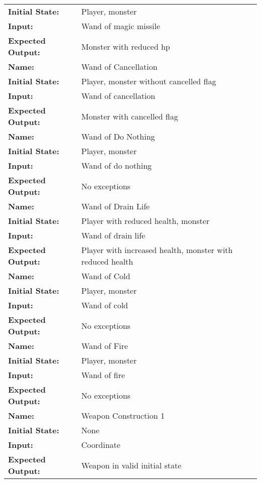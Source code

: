 \documentclass[12pt, titlepage]{article}
\begin{document}
\begin{center}
\begin{longtable}{ l | p{10cm} }
				\textbf{Initial State:} & Player, monster\\
				\textbf{Input:} & Wand of magic missile\\
				\textbf{Expected Output:} & Monster with reduced hp\\[0.6em]
				\hline
				\rule{0pt}{1.5em}\textbf{Name:} & Wand of Cancellation\\
				\textbf{Initial State:} & Player, monster without cancelled flag\\
				\textbf{Input:} & Wand of cancellation\\
				\textbf{Expected Output:} & Monster with cancelled flag\\[0.6em]
				\hline
				\rule{0pt}{1.5em}\textbf{Name:} & Wand of Do Nothing\\
				\textbf{Initial State:} & Player, monster\\
				\textbf{Input:} & Wand of do nothing\\
				\textbf{Expected Output:} & No exceptions\\[0.6em]
				\hline
				\rule{0pt}{1.5em}\textbf{Name:} & Wand of Drain Life\\
				\textbf{Initial State:} & Player with reduced health, monster\\
				\textbf{Input:} & Wand of drain life\\
				\textbf{Expected Output:} & Player with increased health, monster with reduced health\\[0.6em]
				\hline
				\rule{0pt}{1.5em}\textbf{Name:} & Wand of Cold\\
				\textbf{Initial State:} & Player, monster\\
				\textbf{Input:} & Wand of cold\\
				\textbf{Expected Output:} & No exceptions\\[0.6em]
				\hline
				\rule{0pt}{1.5em}\textbf{Name:} & Wand of Fire\\
				\textbf{Initial State:} & Player, monster\\
				\textbf{Input:} & Wand of fire\\
				\textbf{Expected Output:} & No exceptions\\[0.6em]
				\hline
				\rule{0pt}{1.5em}\textbf{Name:} & Weapon Construction 1\\
				\textbf{Initial State:} & None\\
				\textbf{Input:} & Coordinate\\
				\textbf{Expected Output:} & Weapon in valid initial state\\[0.6em]

\end{longtable}
\end{center}
\end{document}
